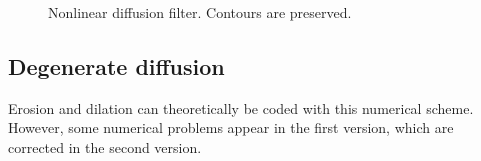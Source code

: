 \begin{figure}[htbp]
\centering\caption{Nonlinear diffusion filter. Contours are preserved.}%
\hfill
{}\hfill
{}
\label{fig:pde:python:nld}
\vspace*{-10pt}
\end{figure}

\subsection{Degenerate diffusion}
Erosion and dilation can theoretically be coded with this numerical scheme. However, some numerical problems appear in the first version, which are corrected in the second version.
